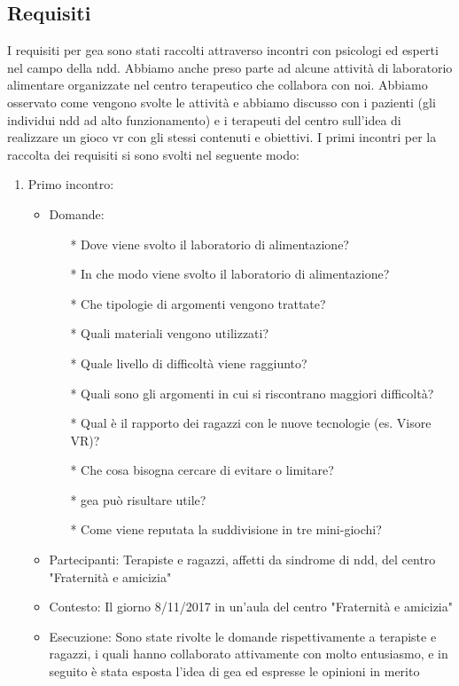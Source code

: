 \subsection{Requisiti} \label{subsec:requis}
I requisiti per \acs{gea} sono stati raccolti attraverso incontri con psicologi ed esperti nel campo della \acs{ndd}. Abbiamo anche preso parte ad alcune attività di laboratorio alimentare organizzate nel centro terapeutico che collabora con noi. Abbiamo osservato come vengono svolte le attività e abbiamo discusso con i pazienti (gli individui \acs{ndd} ad alto funzionamento) e i terapeuti del centro sull'idea di realizzare un gioco \acs{vr} con gli stessi contenuti e obiettivi. I primi incontri per la raccolta dei requisiti si sono svolti nel seguente modo:
\begin{enumerate}
\item Primo incontro:
		\begin{itemize}
		\item Domande: 	\begin{itemize}
						\item[*] Dove viene svolto il laboratorio di alimentazione?
						\item[*] In che modo viene svolto il laboratorio di alimentazione?
						\item[*] Che tipologie di argomenti vengono trattate?
						\item[*] Quali materiali vengono utilizzati?
						\item[*] Quale livello di difficoltà viene raggiunto?
						\item[*] Quali sono gli argomenti in cui si riscontrano maggiori difficoltà?
						\item[*] Qual è il rapporto dei ragazzi con le nuove tecnologie (es. Visore VR)?
						\item[*] Che cosa bisogna cercare di evitare o limitare?
						\item[*] \acs{gea} può risultare utile?
						\item[*] Come viene reputata la suddivisione in tre mini-giochi?		
						\end{itemize}
		\item Partecipanti: Terapiste e ragazzi, affetti da sindrome di \acs{ndd}, del centro "Fraternità 								e amicizia"
		\item Contesto: Il giorno 8/11/2017 in un'aula del centro "Fraternità e amicizia"
		\item Esecuzione: Sono state rivolte le domande rispettivamente a terapiste e ragazzi, i quali 								  hanno collaborato attivamente con molto entusiasmo, e in seguito è stata esposta 						  l'idea di \acs{gea} ed espresse le opinioni in merito 

\end{itemize}
\end{enumerate}

